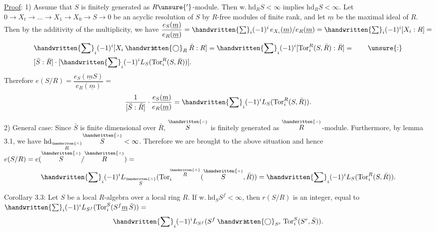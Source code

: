 \uline{Proof}: 1) Assume that $S$ is finitely generated as $R\unsure{'}$-module. Then
$\mathrm{w.}\ \mathrm{hd}_R S<\infty$ implies $\mathrm{hd}_R S<\infty$. Let $0\longrightarrow X_t\longrightarrow\ldots\longrightarrow X_1\longrightarrow X_0\longrightarrow
S\longrightarrow 0$ be an acyclic resolution of $S$ by $R$-free modules of finite rank,
and let $\underline m$ be the maximal ideal of $R$. Then by the additivity of the multiplicity,
we have $\dfrac{e_S(\underline m)}{e_R(\underline m)}=\handwritten{\sum}_i(-1)^i\,e_{X_i}(\underline m)/e_R(\underline m)=\handwritten{\sum}_i(-1)^i[X_i:R]=$
\[
\begin{aligned}
&\handwritten{\sum}_i(-1)^i[X_i\mathbin{\ooalign{\hfil$\mathrm{x}$\hfil\cr\hfil$\handwritten{\bigcirc}$\hfil\cr}}_R\bar R:R]=\handwritten{\sum}_i(-1)^i[\operatorname{Tor}_i^R(S,\bar R):\bar R]=\qquad\unsure{:}\\
&[\bar S:\bar R]\cdot[\handwritten{\sum}_i(-1)^i L_S(\operatorname{Tor}_i^R(S,\bar R))].
\end{aligned}
\]
Therefore $e(S/R)=\dfrac{e_S(\underline m S)}{e_R(\underline m)}=$
\[
\dfrac{1}{[\bar S:\bar R]}\cdot\dfrac{e_S(\underline m)}{e_R(\underline m)}=\handwritten{\sum}_i(-1)^i L_S(\operatorname{Tor}_i^R(S,\bar R)).
\]

2) General case: Since $\bar S$ is finite dimensional over $\bar R$, $\overset{\handwritten{\scriptscriptstyle\wedge}}{S}$ is finitely
generated as $\overset{\handwritten{\scriptscriptstyle\wedge}}{R}$-module. Furthermore, by lemma 3.1, we have $\mathrm{hd}_{\overset{\handwritten{\scriptscriptstyle\wedge}}{R}}\overset{\handwritten{\scriptscriptstyle\wedge}}{S}<\infty$.
Therefore we are brought to the above situation and hence $e(S/R)=e(\overset{\handwritten{\scriptscriptstyle\wedge}}{S}/\overset{\handwritten{\scriptscriptstyle\wedge}}{R})=$
\[
\handwritten{\sum}_i(-1)^i L_{\overset{\handwritten{\scriptscriptstyle\wedge}}{S}}(\operatorname{Tor}_i^{\overset{\handwritten{\scriptscriptstyle\wedge}}{R}}(\overset{\handwritten{\scriptscriptstyle\wedge}}{S},\bar R))=\handwritten{\sum}_i(-1)^i L_S(\operatorname{Tor}_i^R(S,\bar R)).
\]

Corollary 3.3: Let $S$ be a local $R$-algebra over a local ring $R$. If
$\mathrm{w.}\ \mathrm{hd}_S S^f<\infty$, then $r(S/R)$ is an integer, equal to $\handwritten{\sum}_i(-1)^i L_{S^f}(\operatorname{Tor}_i^S(S^f\underline m\,\bar S))=$
\[
\handwritten{\sum}_i(-1)^i L_{S^f}(S^f\mathbin{\ooalign{\hfil$\mathrm{x}$\hfil\cr\hfil$\handwritten{\bigcirc}$\hfil\cr}}_{S^e}\operatorname{Tor}_i^S(S^e,\bar S)).
\]

